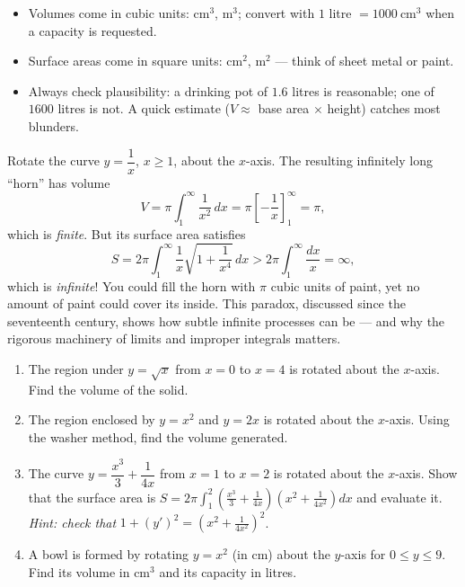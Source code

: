 \documentclass[11pt]{article}
\begin{document}
\begin{attention}
\begin{itemize}
\item Volumes come in cubic units: $\mathrm{cm^{3}}$, $\mathrm{m^{3}}$; convert with $1$ litre $=1000\ \mathrm{cm^{3}}$ when a capacity is requested.
\item Surface areas come in square units: $\mathrm{cm^{2}}$, $\mathrm{m^{2}}$ — think of sheet metal or paint.
\item Always check plausibility: a drinking pot of $1.6$ litres is reasonable; one of $1600$ litres is not. A quick estimate ($V\approx$ base area $\times$ height) catches most blunders.
\end{itemize}
\end{attention}

\begin{savaistu}
Rotate the curve $y=\dfrac{1}{x}$, $x\ge 1$, about the $x$-axis. The resulting infinitely long ``horn'' has volume
\[ V=\pi\int_{1}^{\infty}\frac{1}{x^{2}}\,dx=\pi\left[-\frac{1}{x}\right]_{1}^{\infty}=\pi, \]
which is \emph{finite}. But its surface area satisfies
\[ S=2\pi\int_{1}^{\infty}\frac{1}{x}\sqrt{1+\frac{1}{x^{4}}}\,dx>2\pi\int_{1}^{\infty}\frac{dx}{x}=\infty, \]
which is \emph{infinite}! You could fill the horn with $\pi$ cubic units of paint, yet no amount of paint could cover its inside. This paradox, discussed since the seventeenth century, shows how subtle infinite processes can be — and why the rigorous machinery of limits and improper integrals matters.
\end{savaistu}

\begin{exercice}[Practice]
\begin{enumerate}
\item The region under $y=\sqrt{x}$ from $x=0$ to $x=4$ is rotated about the $x$-axis. Find the volume of the solid.
\item The region enclosed by $y=x^{2}$ and $y=2x$ is rotated about the $x$-axis. Using the washer method, find the volume generated.
\item The curve $y=\dfrac{x^{3}}{3}+\dfrac{1}{4x}$ from $x=1$ to $x=2$ is rotated about the $x$-axis. Show that the surface area is $S=2\pi\displaystyle\int_{1}^{2}\left(\frac{x^{3}}{3}+\frac{1}{4x}\right)\left(x^{2}+\frac{1}{4x^{2}}\right)dx$ and evaluate it. \emph{Hint: check that }$1+(y')^{2}=\left(x^{2}+\frac{1}{4x^{2}}\right)^{2}$.
\item A bowl is formed by rotating $y=x^{2}$ (in cm) about the $y$-axis for $0\le y\le 9$. Find its volume in $\mathrm{cm^{3}}$ and its capacity in litres.
\end{enumerate}
\end{exercice}
\end{document}
